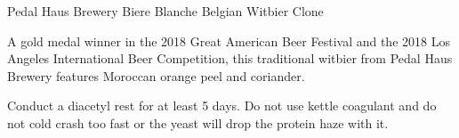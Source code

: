 \begin{recipe}{Pedal Haus Brewery Biere Blanche Belgian Witbier Clone}

\begin{aboutblock}
A gold medal winner in the 2018 Great American Beer Festival and the 2018 Los
Angeles International Beer Competition, this traditional witbier from Pedal Haus
Brewery features Moroccan orange peel and coriander. \sourceaha
\end{aboutblock}


\begin{methodandtiming}
 
\begin{mashsteps}
\end{mashsteps}

\begin{fermentationsteps}
\end{fermentationsteps}

\begin{directions}
Conduct a diacetyl rest for at least 5 days. Do not use kettle coagulant and do
not cold crash too fast or the yeast will drop the protein haze with it.
\end{directions}

\end{methodandtiming}

\recipebreak

\begin{ingredientsblock}

\begin{malts}
\end{malts}

\begin{hops}
\end{hops}


\end{ingredientsblock}

\end{recipe}

